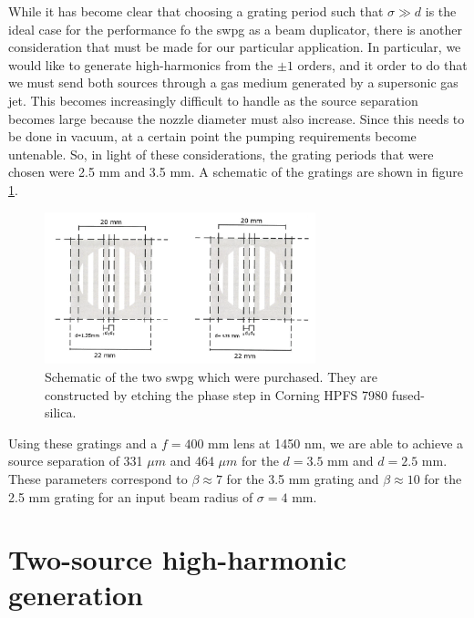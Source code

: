 While it has become clear that choosing a grating period such that $\sigma\gg d$ is the ideal case for the performance fo the \gls{swpg} as a beam duplicator, there is another consideration that must be made for our particular application.  In particular, we would like to generate high-harmonics from the $\pm1$ orders, and it order to do that we must send both sources through a gas medium generated by a supersonic gas jet.  This becomes increasingly difficult to handle as the source separation becomes large because the nozzle diameter must also increase.  Since this needs to be done in vacuum, at a certain point the pumping requirements become untenable.  So, in light of these considerations, the grating periods that were chosen were 2.5 mm and 3.5 mm.  A schematic of the gratings are shown in figure \ref{fig:silios_sketch}.
\begin{figure}
	\centering
	\includegraphics[width=0.7\textwidth]{figures/Two_source/silios_sketch.png}
	\caption{Schematic of the two \gls{swpg} which were purchased.  They are constructed by etching the phase step in Corning HPFS 7980 fused-silica.}
	\label{fig:silios_sketch}
\end{figure}
Using these gratings and a $f=400$ mm lens at 1450 nm, we are able to achieve a source separation of 331 $\mu m$ and 464 $\mu m$ for the $d=3.5$ mm and $d=2.5$ mm.  These parameters correspond to $\beta\approx7$ for the 3.5 mm grating and $\beta\approx10$ for the 2.5 mm grating for an input beam radius of $\sigma=4$ mm.

\section{Two-source high-harmonic generation}

